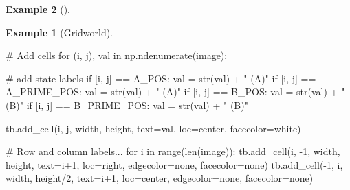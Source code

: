 \documentclass[
  letterpaper,
]{krantz}
\makeatletter
\newenvironment{Shaded}{\begin{snugshade}}{\end{snugshade}}
\newcommand{\BuiltInTok}[1]{\textcolor[rgb]{0.00,0.23,0.31}{#1}}
\newcommand{\CommentTok}[1]{\textcolor[rgb]{0.37,0.37,0.37}{#1}}
\newcommand{\ControlFlowTok}[1]{\textcolor[rgb]{0.00,0.23,0.31}{#1}}
\newcommand{\DecValTok}[1]{\textcolor[rgb]{0.68,0.00,0.00}{#1}}
\newcommand{\KeywordTok}[1]{\textcolor[rgb]{0.00,0.23,0.31}{#1}}
\newcommand{\NormalTok}[1]{\textcolor[rgb]{0.00,0.23,0.31}{#1}}
\newcommand{\OperatorTok}[1]{\textcolor[rgb]{0.37,0.37,0.37}{#1}}
\newcommand{\StringTok}[1]{\textcolor[rgb]{0.13,0.47,0.30}{#1}}
\newenvironment{kframe}{%
\medskip{}
\setlength{\fboxsep}{.8em}
 \def\at@end@of@kframe{}%
 \ifinner\ifhmode%
  \def\at@end@of@kframe{\end{minipage}}%
  \begin{minipage}{\columnwidth}%
 \fi\fi%
 \def\FrameCommand##1{\hskip\@totalleftmargin \hskip-\fboxsep
 \colorbox{shadecolor}{##1}\hskip-\fboxsep
     \hskip-\linewidth \hskip-\@totalleftmargin \hskip\columnwidth}%
 \MakeFramed {\advance\hsize-\width
   \@totalleftmargin\z@ \linewidth\hsize
   \@setminipage}}%
 {\par\unskip\endMakeFramed%
 \at@end@of@kframe}
\renewenvironment{Shaded}{\begin{kframe}}{\end{kframe}}
\theoremstyle{plain}
\theoremstyle{definition}
\newtheorem{example}{Example}[chapter]
\theoremstyle{definition}
\theoremstyle{remark}
\makeatother
\begin{document}
\begin{example}[]
\begin{example}[Gridworld]
\begin{tcolorbox}[enhanced jigsaw, bottomrule=.15mm, opacityback=0, breakable, colframe=quarto-callout-tip-color-frame, left=2mm, rightrule=.15mm, toprule=.15mm, leftrule=.75mm, arc=.35mm, colback=white]
\begin{codelisting}[H]
\begin{Shaded}
\begin{Highlighting}[]
    \CommentTok{\# Add cells}
    \ControlFlowTok{for}\NormalTok{ (i, j), val }\KeywordTok{in}\NormalTok{ np.ndenumerate(image):}

        \CommentTok{\# add state labels}
        \ControlFlowTok{if}\NormalTok{ [i, j] }\OperatorTok{==}\NormalTok{ A\_POS:}
\NormalTok{            val }\OperatorTok{=} \BuiltInTok{str}\NormalTok{(val) }\OperatorTok{+} \StringTok{" (A)"}
        \ControlFlowTok{if}\NormalTok{ [i, j] }\OperatorTok{==}\NormalTok{ A\_PRIME\_POS:}
\NormalTok{            val }\OperatorTok{=} \BuiltInTok{str}\NormalTok{(val) }\OperatorTok{+} \StringTok{" (A\textquotesingle{})"}
        \ControlFlowTok{if}\NormalTok{ [i, j] }\OperatorTok{==}\NormalTok{ B\_POS:}
\NormalTok{            val }\OperatorTok{=} \BuiltInTok{str}\NormalTok{(val) }\OperatorTok{+} \StringTok{" (B)"}
        \ControlFlowTok{if}\NormalTok{ [i, j] }\OperatorTok{==}\NormalTok{ B\_PRIME\_POS:}
\NormalTok{            val }\OperatorTok{=} \BuiltInTok{str}\NormalTok{(val) }\OperatorTok{+} \StringTok{" (B\textquotesingle{})"}
        
\NormalTok{        tb.add\_cell(i, j, width, height, text}\OperatorTok{=}\NormalTok{val,}
\NormalTok{                    loc}\OperatorTok{=}\StringTok{\textquotesingle{}center\textquotesingle{}}\NormalTok{, facecolor}\OperatorTok{=}\StringTok{\textquotesingle{}white\textquotesingle{}}\NormalTok{)}
        
    \CommentTok{\# Row and column labels...}
    \ControlFlowTok{for}\NormalTok{ i }\KeywordTok{in} \BuiltInTok{range}\NormalTok{(}\BuiltInTok{len}\NormalTok{(image)):}
\NormalTok{        tb.add\_cell(i, }\OperatorTok{{-}}\DecValTok{1}\NormalTok{, width, height, text}\OperatorTok{=}\NormalTok{i}\OperatorTok{+}\DecValTok{1}\NormalTok{, loc}\OperatorTok{=}\StringTok{\textquotesingle{}right\textquotesingle{}}\NormalTok{,}
\NormalTok{                    edgecolor}\OperatorTok{=}\StringTok{\textquotesingle{}none\textquotesingle{}}\NormalTok{, facecolor}\OperatorTok{=}\StringTok{\textquotesingle{}none\textquotesingle{}}\NormalTok{)}
\NormalTok{        tb.add\_cell(}\OperatorTok{{-}}\DecValTok{1}\NormalTok{, i, width, height}\OperatorTok{/}\DecValTok{2}\NormalTok{, text}\OperatorTok{=}\NormalTok{i}\OperatorTok{+}\DecValTok{1}\NormalTok{, loc}\OperatorTok{=}\StringTok{\textquotesingle{}center\textquotesingle{}}\NormalTok{,}
\NormalTok{                    edgecolor}\OperatorTok{=}\StringTok{\textquotesingle{}none\textquotesingle{}}\NormalTok{, facecolor}\OperatorTok{=}\StringTok{\textquotesingle{}none\textquotesingle{}}\NormalTok{)}


\end{Highlighting}
\end{Shaded}
\end{codelisting}
\end{tcolorbox}
\end{example}
\end{example}
\end{document}
